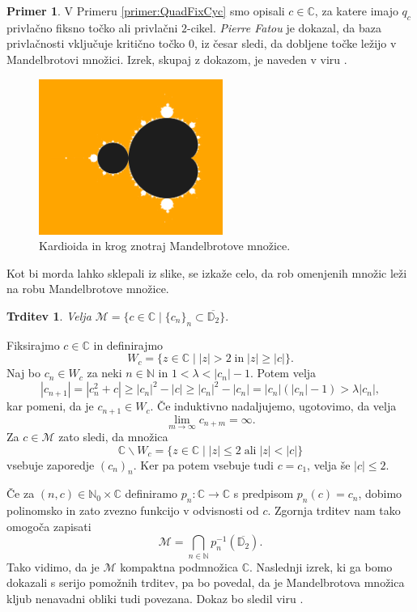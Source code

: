 \documentclass[12pt,a4paper]{amsart}
\theoremstyle{definition} %
\newtheorem{primer}[definicija]{Primer}
\theoremstyle{plain} %
\newtheorem{trditev}[definicija]{Trditev}
\newcommand{\N}{\mathbb N}
\newcommand{\CC}{\mathbb C}
\newcommand{\D}{\mathbb D} %
\newcommand{\M}{\mathscr M} %
\begin{document}
\begin{primer}
V Primeru \ref{primer:QuadFixCyc} smo opisali $c \in \CC$, 
za katere imajo $q_c$ privlačno fiksno točko ali privlačni $2$-cikel.
{\em Pierre Fatou} je dokazal, da baza privlačnosti vključuje kritično točko $0$,
iz česar sledi, da dobljene točke ležijo v Mandelbrotovi množici.
Izrek, skupaj z dokazom, je naveden v viru \cite[Izrek~8.6]{milnor}.

\begin{figure}[h]
\includegraphics[width=6cm]{graphics/mand.png}
\caption{Kardioida in krog znotraj Mandelbrotove množice.}
\end{figure}

\noindent Kot bi morda lahko sklepali iz slike, se izkaže celo, 
da rob omenjenih množic leži na robu Mandelbrotove množice.
\end{primer}

\begin{trditev}\label{trd:MandelbrotBounded}
Velja $\M = \{c \in \CC \mid \{c_n\}_n \subset \overline{\D_2} \}.$
\end{trditev}

\proof
Fiksirajmo $c \in \CC$ in definirajmo
$$W_c = \{z \in \CC \mid |z| > 2 \; \text{in} \; |z| \geq |c|\}.$$
Naj bo $c_n \in W_c$ za neki $n \in \N$ in $1 < \lambda < |c_n| - 1$. Potem velja
$$|c_{n+1}| = |c_n^2 + c| \geq |c_n|^2 - |c| \geq |c_n|^2 - |c_n| = |c_n| (|c_n| - 1) > \lambda|c_n|,$$
kar pomeni, da je $c_{n + 1} \in W_c$. 
Če induktivno nadaljujemo, ugotovimo, da velja 
$$\lim_{m \to \infty}c_{n + m} = \infty.$$
Za $c \in \M$ zato sledi, da množica
$$\CC \smallsetminus W_c = \{z \in \CC \mid |z| \leq 2 \; \text{ali} \; |z| < |c|\}$$
vsebuje zaporedje  $(c_n)_n$. Ker pa potem vsebuje tudi $c = c_1$, 
velja še $|c| \leq 2$.
\endproof

Če za $(n,c) \in \N_0 \times \CC$ definiramo $p_n \colon \CC \to \CC$ s predpisom  $ p_n(c) = c_n$, 
dobimo polinomsko in zato zvezno funkcijo v odvisnosti od $c$.
Zgornja trditev nam tako omogoča zapisati 
$$\M = \bigcap_{n \in \N} p_n^{-1}\left(\overline{\D_2}\right).$$
Tako vidimo, da je $\M$ kompaktna podmnožica $\CC$.
Naslednji izrek, ki ga bomo dokazali s serijo pomožnih trditev, pa bo povedal, 
da je Mandelbrotova množica kljub nenavadni obliki tudi povezana.
Dokaz bo sledil viru \cite[Izrek~5.3]{stoll}.
\end{document}
